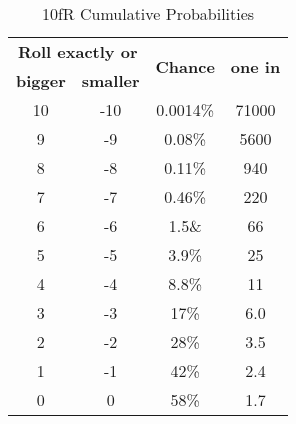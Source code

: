 \begin{table}[htb]
    \caption[10fR Cumulative Probabilities]{10fR Cumulative Probabilities}
    \label{tab:10fR cumulative probabilities}
    \centering
    \begin{tabular}{cccc}
        \toprule
        \multicolumn{2}{c}{\textbf{Roll exactly or}} & \multirow{2}{*}{\textbf{Chance}} & \multirow{2}{*}{\textbf{one in}}         \\
        \cmidrule{1-2}
        \textbf{bigger}                              & \textbf{smaller}                 &                                  &       \\
        \midrule
        10                                           & -10                              & 0.0014\%                         & 71000 \\
        9                                            & -9                               & 0.08\%                           & 5600  \\
        8                                            & -8                               & 0.11\%                           & 940   \\
        7                                            & -7                               & 0.46\%                           & 220   \\
        6                                            & -6                               & 1.5\&                            & 66    \\
        5                                            & -5                               & 3.9\%                            & 25    \\
        4                                            & -4                               & 8.8\%                            & 11    \\
        3                                            & -3                               & 17\%                             & 6.0   \\
        2                                            & -2                               & 28\%                             & 3.5   \\
        1                                            & -1                               & 42\%                             & 2.4   \\
        0                                            & 0                                & 58\%                             & 1.7   \\
        \bottomrule
    \end{tabular}
\end{table}

